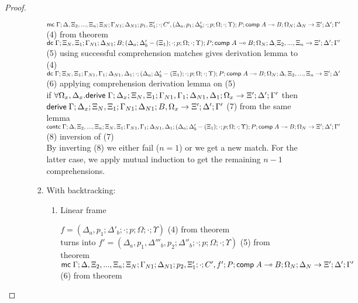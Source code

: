 \begin{proof}
\begin{enumerate}
\begin{itemize}
\begin{enumerate}
            $\mathsf{mc} \; \Gamma; \Delta, \Xi_2, ..., \Xi_n; \Xi_N; \Gamma_{N1}; \Delta_{N1}; p_1, \Xi'_1; \cdot; C', (\Delta_a, p_1; \Delta'_b; \cdot; p; \Omega; \cdot; \Upsilon); P; \mathsf{comp} \; A \multimap B; \Omega_N; \Delta_N \rightarrow \Xi'; \Delta'; \Gamma'$ \hfill (4) from theorem \\
            $\mathsf{dc} \; \Gamma; \Xi_N, \Xi_1; \Gamma_{N1}; \Delta_{N1}; B; (\Delta_a; \Delta'_b - (\Xi_1); \cdot; p; \Omega; \cdot; \Upsilon); P; \mathsf{comp} \; A \multimap B; \Omega_N; \Delta_, \Xi_2, ..., \Xi_n \rightarrow \Xi'; \Delta'; \Gamma'$ \hfill (5) using successful comprehension matches gives derivation lemma to (4) \\
              $\mathsf{dc} \; \Gamma; \Xi_N, \Xi_1; \Gamma_{N1}, \Gamma_1; \Delta_{N1}, \Delta_1; \cdot; (\Delta_a; \Delta'_b - (\Xi_1); \cdot; p; \Omega; \cdot; \Upsilon); P; \mathsf{comp} \; A \multimap B; \Omega_N; \Delta, \Xi_2, ..., \Xi_n \rightarrow \Xi'; \Delta'$ \hfill (6) applying comprehension derivation lemma on (5) \\
              if $\forall \Omega_x, \Delta_x. \mathsf{derive} \; \Gamma; \Delta_x; \Xi_N, \Xi_1; \Gamma_{N1}, \Gamma_1; \Delta_{N1}, \Delta_1; \Omega_x \rightarrow \Xi'; \Delta'; \Gamma'$ then $\mathsf{derive} \; \Gamma; \Delta_x; \Xi_N, \Xi_1; \Gamma_{N1}; \Delta_{N1}; B, \Omega_x \rightarrow \Xi'; \Delta'; \Gamma'$ \hfill (7) from the same lemma \\
              $\mathsf{contc} \; \Gamma; \Delta, \Xi_2, ..., \Xi_n; \Xi_N, \Xi_1; \Gamma_{N1}, \Gamma_1; \Delta_{N1}, \Delta_1; (\Delta_a; \Delta'_b - (\Xi_1); \cdot; p; \Omega; \cdot; \Upsilon); P; \mathsf{comp} \; A \multimap B; \Omega_N \rightarrow \Xi'; \Delta'; \Gamma'$ \hfill (8) inversion of (7) \\
              
              By inverting (8) we either fail ($n = 1$) or we get a new match. For the latter case, we apply mutual induction to get the remaining $n - 1$ comprehensions.
            
            \item With backtracking:
            
            \begin{enumerate}
               \item Linear frame
               
               $f = (\Delta_a, p_1; \Delta'_b; \cdot; p; \Omega; \cdot; \Upsilon)$ \hfill (4) from theorem \\
               turns into $f' = (\Delta_a, p_1, \Delta'''_b, p_2; \Delta''_b; \cdot; p; \Omega; \cdot; \Upsilon)$ \hfill (5) from theorem \\
               $\mathsf{mc} \; \Gamma; \Delta, \Xi_2, ..., \Xi_n; \Xi_N; \Gamma_{N1}; \Delta_{N1}; p_2, \Xi'_1; \cdot; C', f'; P; \mathsf{comp} \; A \multimap B; \Omega_N; \Delta_N \rightarrow \Xi'; \Delta'; \Gamma'$ \hfill (6) from theorem \\
               

\end{enumerate}
\end{enumerate}
\end{itemize}
\end{enumerate}
\end{proof}
